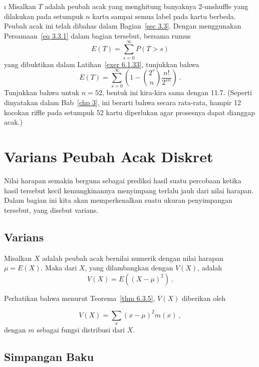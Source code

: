 \begin{LJSItem}
\i\label{exer 6.1.42}
Misalkan $T$ adalah peubah acak yang menghitung banyaknya 2-unshuffle yang dilakukan pada setumpuk $n$ kartu
sampai semua label pada kartu berbeda. Peubah acak ini telah dibahas dalam
Bagian~\ref{sec 3.3}. Dengan menggunakan Persamaan~\ref{eq 3.3.1} dalam bagian tersebut, bersama rumus
$$
E(T) = \sum_{s = 0}^\infty P(T > s)
$$
yang dibuktikan dalam Latihan~\ref{exer 6.1.33}, tunjukkan bahwa
$$
E(T) = \sum_{s = 0}^\infty \left(1 - {{2^s}\choose n}\frac {n!}{2^{sn}}\right)\ .
$$
Tunjukkan bahwa untuk $n = 52$, bentuk ini kira-kira sama dengan 11.7. (Seperti dinyatakan dalam
Bab~\ref{chp 3}, ini berarti bahwa secara rata-rata, hampir 12 kocokan riffle pada setumpuk 52 kartu
diperlukan agar prosesnya dapat dianggap acak.)


\end{LJSItem}

\section{Varians Peubah Acak Diskret}\label{sec 6.2}

Nilai harapan semakin berguna sebagai prediksi hasil suatu percobaan ketika hasil
tersebut kecil kemungkinannya menyimpang terlalu jauh dari nilai harapan. Dalam bagian
ini kita akan memperkenalkan suatu ukuran penyimpangan tersebut, yang disebut
varians.

\subsection*{Varians}


\begin{definition}\label{def 6.4} Misalkan $X$ adalah peubah acak bernilai numerik
dengan nilai harapan $\mu = E(X)$. Maka  dari $X$, yang dilambangkan dengan
$V(X)$, adalah
$$ V(X) = E((X - \mu)^2)\ .
$$
\end{definition} Perhatikan bahwa menurut Teorema~\ref{thm 6.3.5}, $V(X)$ diberikan oleh

\begin{equation} V(X) = \sum_x (x - \mu)^2 m(x)\ , 
\label{eq 6.1}
\end{equation} dengan $m$ sebagai fungsi distribusi dari $X$.

\subsection*{Simpangan Baku}

